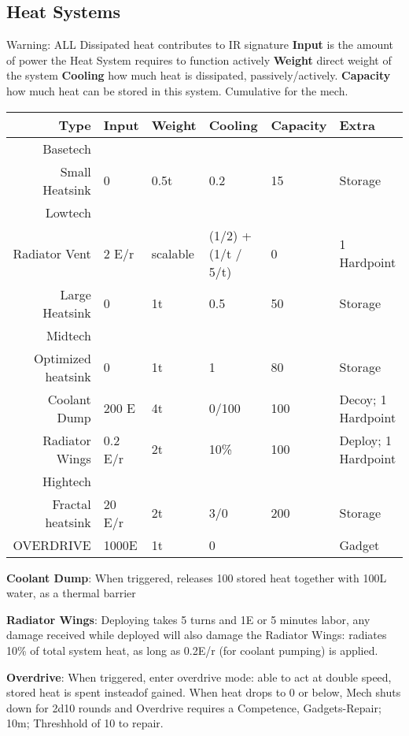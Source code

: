 \subsection{Heat Systems}\label{subsec:heat-systems}
Warning: ALL Dissipated heat contributes to IR signature
\textbf{Input} is the amount of power the Heat System requires to function actively
\textbf{Weight} direct weight of the system
\textbf{Cooling} how much heat is dissipated, passively/actively.
\textbf{Capacity} how much heat can be stored in this system.
Cumulative for the mech.

\begin{tabular}{r|lllll}
    Type & Input & Weight & Cooling & Capacity &Extra\\
    \hline Basetech\\
    Small Heatsink & 0 & 0.5t & 0.2 & 15 & Storage\\
    \hline Lowtech\\
    Radiator Vent & 2 E/r &scalable &(1/2) + (1/t / 5/t) & 0 & 1 Hardpoint\\
    Large Heatsink & 0 & 1t & 0.5 & 50 &Storage\\
    \hline Midtech\\
    Optimized heatsink  & 0 & 1t & 1 & 80 &Storage\\
    Coolant Dump  & 200 E & 4t & 0/100 & 100 & Decoy; 1 Hardpoint \\
    Radiator Wings & 0.2 E/r & 2t & 10\% & 100 & Deploy; 1 Hardpoint\\
    \hline Hightech\\
    Fractal heatsink & 20 E/r & 2t & 3/0 & 200 & Storage\\
    OVERDRIVE & 1000E & 1t & 0 & & Gadget
\end{tabular}\par

\textbf{Coolant Dump}: When triggered, releases 100 stored heat together with 100L water, as a thermal barrier

\textbf{Radiator Wings}: Deploying takes 5 turns and 1E or 5 minutes labor, any damage received while deployed
will also damage the Radiator Wings: radiates 10\% of total system heat, as long as 0.2E/r (for coolant pumping)
is applied.

\textbf{Overdrive}: When triggered, enter overdrive mode: able to act at double speed,
stored heat is spent insteadof gained.
When heat drops to 0 or below, Mech shuts down for 2d10 rounds and Overdrive requires a Competence, Gadgets-Repair;
10m;
Threshhold of 10 to repair.


